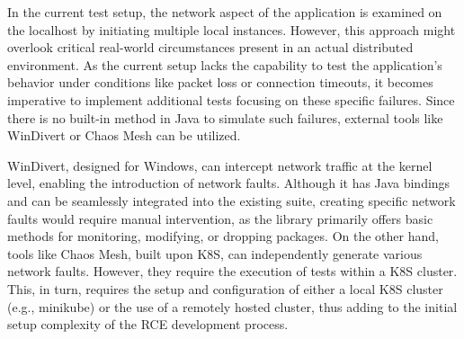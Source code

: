 In the current test setup, the network aspect of the application is examined on the localhost by initiating multiple local instances. However, this approach might overlook critical real-world circumstances present in an actual distributed environment. As the current setup lacks the capability to test the application's behavior under conditions like packet loss or connection timeouts, it becomes imperative to implement additional tests focusing on these specific failures. Since there is no built-in method in Java to simulate such failures, external tools like WinDivert or Chaos Mesh can be utilized.

WinDivert, designed for Windows, can intercept network traffic at the kernel level, enabling the introduction of network faults. Although it has Java bindings and can be seamlessly integrated into the existing suite, creating specific network faults would require manual intervention, as the library primarily offers basic methods for monitoring, modifying, or dropping packages. On the other hand, tools like Chaos Mesh, built upon \ac{K8S}, can independently generate various network faults. However, they require the execution of tests within a \ac{K8S} cluster. This, in turn, requires the setup and configuration of either a local \ac{K8S} cluster (e.g., minikube) or the use of a remotely hosted cluster, thus adding to the initial setup complexity of the \ac{RCE} development process.